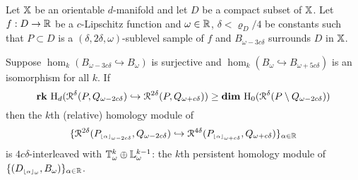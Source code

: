 \begin{theorem}\label{thm:main}
  Let $\mathbb{X}$ be an orientable $d$-manifold and let $D$ be a compact subset of $\mathbb{X}$.
  Let $f : D\to\mathbb{R}$ be a $c$-Lipschitz function and $\omega\in\mathbb{R}$, $\delta < \varrho_D/4$ be constants such that $P\subset D$ is a $(\delta, 2\delta,\omega)$-sublevel sample of $f$ and $B_{\omega-3c\delta}$ surrounds $D$ in $\mathbb{X}$.

  Suppose $\hom_k(B_{\omega-3c\delta}\hookrightarrow B_\omega)$ is surjective and $\hom_k(B_\omega\hookrightarrow B_{\omega+5c\delta})$ is an isomorphism for all $k$.
  If
    \[\mathbf{rk}~\mathrm{H}_d(\mathcal{R}^\delta(P, Q_{\omega - 2c\delta})\hookrightarrow \mathcal{R}^{2\delta}(P, Q_{\omega+c\delta})) \geq \mathbf{dim}~\mathrm{H}_0(\mathcal{R}^\delta(P\setminus Q_{\omega-2c\delta}))\]
  then the $k$th (relative) homology module of
  \[\{\mathcal{R}^{2\delta}(P_{\scriptscriptstyle \lfloor\alpha\rfloor_{\omega-2c\delta}}, Q_{\omega-2c\delta})\hookrightarrow \mathcal{R}^{4\delta}(P_{\scriptscriptstyle \lfloor\alpha\rfloor_{\omega+c\delta}}, Q_{\omega+c\delta})\}_{\alpha\in\mathbb{R}}\]
  is $4c\delta$-interleaved with $\mathbb{T}_{\omega}^k \oplus \mathbb{L}_\omega^{k-1}$: the $k$th persistent homology module of $\{(D_{\scriptscriptstyle \lfloor\alpha\rfloor_{\omega}}, B_\omega)\}_{\alpha\in\mathbb{R}}$.
\end{theorem}
%
